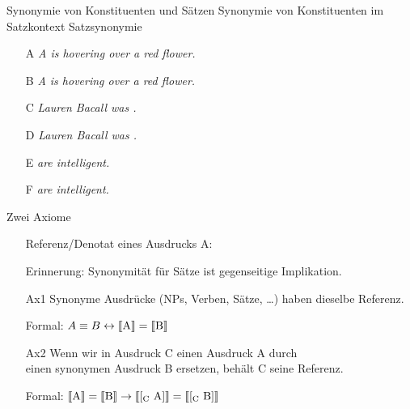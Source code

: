 \begin{frame}
  {Synonymie von Konstituenten und Sätzen}
  Synonymie von Konstituenten im Satzkontext  Satzsynonymie\\
  \onslide<+->
  \Halbzeile
  \begin{itemize}[<+->]
    \item[A] \alert{\textit{A  is hovering over a red flower.}}
    \item[B] \alert{\textit{A  is hovering over a red flower.}}
    \item[ ] 
      \Halbzeile
    \item[C] \alert{\textit{Lauren Bacall was .}}
    \item[D] \alert{\textit{Lauren Bacall was .}}
    \item[ ] 
      \Halbzeile
    \item[E] \alert{\textit{ are intelligent.}}
    \item[F] \alert{\textit{ are intelligent.}}
    \item[ ] 
  \end{itemize}
\end{frame}

\begin{frame}
  {Zwei Axiome}
  \onslide<+->
  \begin{itemize}[<+->]
    \item[ ] Referenz\slash Denotat eines Ausdrucks A: \alert{}
      \Zeile
    \item[ ] Erinnerung: Synonymität für Sätze ist gegenseitige Implikation.
      \Zeile
    \item[Ax1] Synonyme Ausdrücke (NPs, Verben, Sätze, \ldots) haben dieselbe Referenz.
    \item[ ] Formal: \alert{$A\equiv B\leftrightarrow\llbracket\text{A}\rrbracket=\llbracket\text{B}\rrbracket$}
      \Zeile
    \item[Ax2] Wenn wir in Ausdruck C einen Ausdruck A durch\\
      einen synonymen Ausdruck B ersetzen, behält C seine Referenz.
    \item[ ] Formal: \alert{$\llbracket\text{A}\rrbracket=\llbracket\text{B}\rrbracket\rightarrow\llbracket\text{[\ensuremath{_{\text{C}}} A]}\rrbracket=\llbracket\text{[\ensuremath{_{\text{C}}} B]}\rrbracket$}
  \end{itemize}
\end{frame}

